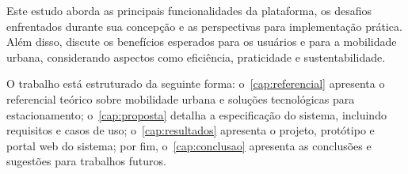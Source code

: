 Este estudo aborda as principais funcionalidades da plataforma, os desafios enfrentados durante sua concepção e as perspectivas para implementação prática. Além disso, discute os benefícios esperados para os usuários e para a mobilidade urbana, considerando aspectos como eficiência, praticidade e sustentabilidade.

O trabalho está estruturado da seguinte forma: o~\autoref{cap:referencial} apresenta o referencial teórico sobre mobilidade urbana e soluções tecnológicas para estacionamento; o~\autoref{cap:proposta} detalha a especificação do sistema, incluindo requisitos e casos de uso; o~\autoref{cap:resultados} apresenta o projeto, protótipo e portal web do sistema; por fim, o~\autoref{cap:conclusao} apresenta as conclusões e sugestões para trabalhos futuros.
